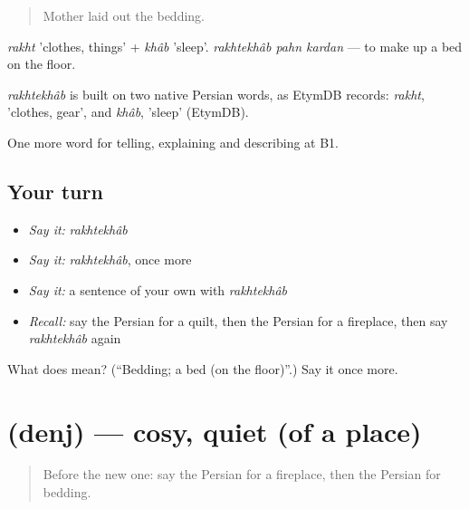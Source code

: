 \begin{quote}
Mother laid out the bedding.
\end{quote}

\emph{rakht} 'clothes, things' + \emph{khâb} 'sleep'. \emph{rakhtekhâb pahn kardan} — to make up a bed on the floor.

\begin{cousinweb}
\emph{rakhtekhâb} is built on two native Persian words, as EtymDB records: \emph{rakht}, 'clothes, gear', and \emph{khâb}, 'sleep' (EtymDB).
\end{cousinweb}

\begin{grammarlens}[title={What you've built}]
One more word for telling, explaining and describing at B1.
\end{grammarlens}

\subsection*{Your turn}
\begin{itemize}
\raggedright
  \item \emph{Say it:} \emph{rakhtekhâb}
  \item \emph{Say it:} \emph{rakhtekhâb}, once more
  \item \emph{Say it:} a sentence of your own with \emph{rakhtekhâb}
  \item \emph{Recall:} say the Persian for a quilt, then the Persian for a fireplace, then say \emph{rakhtekhâb} again
\end{itemize}

\begin{tcolorbox}[breakable,colback=teal!4,colframe=teal!35!black,title={Before you move on}]
What does  mean? (\textquotedblleft{}Bedding; a bed (on the floor)\textquotedblright{}.) Say it once more.
\end{tcolorbox}
\section[\texorpdfstring{\fa{دنج} (denj)}{دنج (denj)}]{ (denj) — cosy, quiet (of a place)}

\label{lesson:FA-C535-denj}



\begin{quote}
Before the new one: say the Persian for a fireplace, then the Persian for bedding.
\end{quote}

